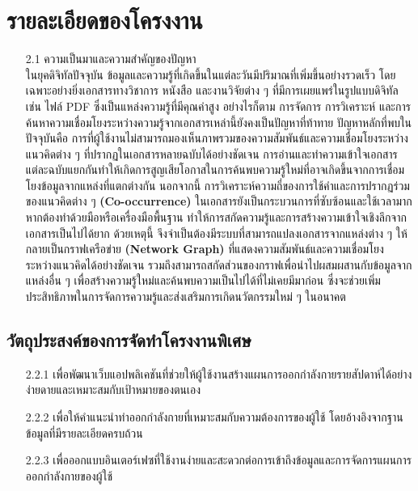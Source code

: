 \documentclass[12pt,a4paper]{article}
\newcommand{\textlight}[1]{{\thailightfont #1}}
\begin{document}
\section{รายละเอียดของโครงงาน}
\begin{enumerate}[leftmargin=2cm]
\small
    \item[2.1] ความเป็นมาและความสำคัญของปัญหา
    \\[0.2cm]
    \textlight{
        ในยุคดิจิทัลปัจจุบัน ข้อมูลและความรู้ที่เกิดขึ้นในแต่ละวันมีปริมาณที่เพิ่มขึ้นอย่างรวดเร็ว โดยเฉพาะอย่างยิ่งเอกสารทางวิชาการ หนังสือ และงานวิจัยต่าง ๆ ที่มีการเผยแพร่ในรูปแบบดิจิทัล เช่น ไฟล์ PDF ซึ่งเป็นแหล่งความรู้ที่มีคุณค่าสูง อย่างไรก็ตาม การจัดการ การวิเคราะห์ และการค้นหาความเชื่อมโยงระหว่างความรู้จากเอกสารเหล่านี้ยังคงเป็นปัญหาที่ท้าทาย
    ปัญหาหลักที่พบในปัจจุบันคือ การที่ผู้ใช้งานไม่สามารถมองเห็นภาพรวมของความสัมพันธ์และความเชื่อมโยงระหว่างแนวคิดต่าง ๆ ที่ปรากฏในเอกสารหลายฉบับได้อย่างชัดเจน การอ่านและทำความเข้าใจเอกสารแต่ละฉบับแยกกันทำให้เกิดการสูญเสียโอกาสในการค้นพบความรู้ใหม่ที่อาจเกิดขึ้นจากการเชื่อมโยงข้อมูลจากแหล่งที่แตกต่างกัน
    นอกจากนี้ การวิเคราะห์ความถี่ของการใช้คำและการปรากฏร่วมของแนวคิดต่าง ๆ \textbf{(Co-occurrence)} ในเอกสารยังเป็นกระบวนการที่ซับซ้อนและใช้เวลามาก หากต้องทำด้วยมือหรือเครื่องมือพื้นฐาน ทำให้การสกัดความรู้และการสร้างความเข้าใจเชิงลึกจากเอกสารเป็นไปได้ยาก
    ด้วยเหตุนี้ จึงจำเป็นต้องมีระบบที่สามารถแปลงเอกสารจากแหล่งต่าง ๆ ให้กลายเป็นกราฟเครือข่าย \textbf{(Network Graph)} ที่แสดงความสัมพันธ์และความเชื่อมโยงระหว่างแนวคิดได้อย่างชัดเจน รวมถึงสามารถสกัดส่วนของกราฟเพื่อนำไปผสมผสานกับข้อมูลจากแหล่งอื่น ๆ เพื่อสร้างความรู้ใหม่และค้นพบความเป็นไปได้ที่ไม่เคยมีมาก่อน ซึ่งจะช่วยเพิ่มประสิทธิภาพในการจัดการความรู้และส่งเสริมการเกิดนวัตกรรมใหม่ ๆ ในอนาคต
    }
    
\end{enumerate}

\subsection{วัตถุประสงค์ของการจัดทำโครงงานพิเศษ}
\begin{enumerate}
    \item[2.2.1] เพื่อพัฒนาเว็บแอปพลิเคชันที่ช่วยให้ผู้ใช้งานสร้างแผนการออกกำลังกายรายสัปดาห์ได้อย่างง่ายดายและเหมาะสมกับเป้าหมายของตนเอง
    \item[2.2.2] เพื่อให้คำแนะนำท่าออกกำลังกายที่เหมาะสมกับความต้องการของผู้ใช้ โดยอ้างอิงจากฐานข้อมูลที่มีรายละเอียดครบถ้วน
    \item[2.2.3] เพื่อออกแบบอินเตอร์เฟซที่ใช้งานง่ายและสะดวกต่อการเข้าถึงข้อมูลและการจัดการแผนการออกกำลังกายของผู้ใช้
\end{enumerate}
\end{document}
